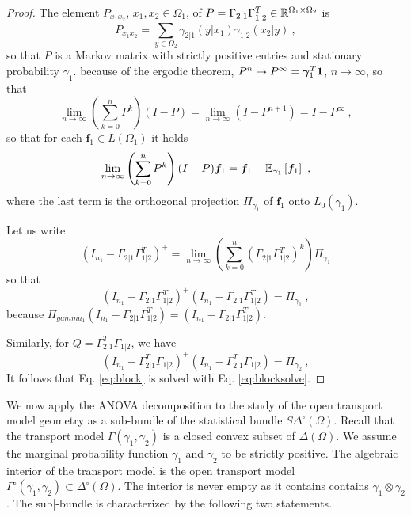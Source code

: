 \documentclass[runningheads]{llncs}
\begin{document}
\begin{proof}
The element $P_{x_1x_2}$, $x_1,x_2 \in \Omega_1$, of $P = \Gamma_{2|1}\Gamma_{1|2}^T \in \mathbb R^{\Omega_1 \times \Omega_2}$ is
%
\begin{equation*}
  P_{x_1x_2} = \sum_{y \in \Omega_2} \gamma_{2|1}(y|x_1) \gamma_{1|2}(x_2|y) \ ,
\end{equation*}
%
so that $P$ is a Markov matrix with strictly positive entries and stationary probability $\gamma_1$. because of the ergodic theorem, $P^n \to P^\infty = {\bm \gamma}_1^T \bm 1$, $n \to \infty$, so that 
%
\begin{equation*}
\lim_{n\to\infty} \left(\sum_{k=0}^n P^k\right)(I-P) = \lim_{n\to\infty} \left(I - P^{n+1}\right) = I - P^\infty \ , 
\end{equation*}
%
so that for each $\bm f_1 \in L(\Omega_1)$ it holds
%
\begin{equation*}
  \lim_{n\to\infty} \left(\sum_{k=0}^n P^k\right)(I-P) \bm f_1 = \bm f_1 - {\operatorname{\mathbb E}}_{\gamma_1}\left[\bm f_1\right] \ ,
\end{equation*}
%
where the last term is the orthogonal projection $\Pi_{\gamma_1}$ of $\bm f_1$ onto $L_0(\gamma_1)$. 

Let us write
%
\begin{equation*}
  (I_{n_1}-\Gamma_{2|1}\Gamma_{1|2}^T)^{+} = \lim_{n\to\infty} \left(\sum_{k=0}^n (\Gamma_{2|1}\Gamma_{1|2}^T)^k\right) \Pi_{\gamma_1}  
\end{equation*}
%
so that
%
\begin{equation*}
  (I_{n_1}-\Gamma_{2|1}\Gamma_{1|2}^T)^{+}(I_{n_1}-\Gamma_{2|1}\Gamma_{1|2}^T) = \Pi_{\gamma_1} \ ,
\end{equation*}
%
because $\Pi_{gamma_1} (I_{n_1}-\Gamma_{2|1}\Gamma_{1|2}^T) = (I_{n_1}-\Gamma_{2|1}\Gamma_{1|2}^T)$.

Similarly, for $Q = \Gamma_{2|1}^T\Gamma_{1|2}$, we have
%
\begin{equation*}
  (I_{n_1}-\Gamma_{2|1}^T\Gamma_{1|2})^{+}(I_{n_1}-\Gamma_{2|1}^T\Gamma_{1|2}) = \Pi_{\gamma_2} \ ,
\end{equation*}
%
It follows that Eq. \eqref{eq:block} is solved with Eq. \eqref{eq:blocksolve}.
\end{proof}

We now apply the ANOVA decomposition to the study of the open transport model geometry as a sub-bundle of the statistical bundle $S\Delta^\circ(\Omega)$. Recall that the transport model $\Gamma(\gamma_1,\gamma_2)$ is a closed convex subset of $\Delta(\Omega)$. We assume the marginal probability function $\gamma_1$ and $\gamma_2$ to be strictly positive. The algebraic interior of the transport model is the open transport model $\Gamma^\circ(\gamma_1,\gamma_2) \subset \Delta^\circ(\Omega)$. The interior is never empty as it contains  contains $\gamma_1 \otimes \gamma_2$. The sub[-bundle is characterized by the following two statements.
\end{document}
